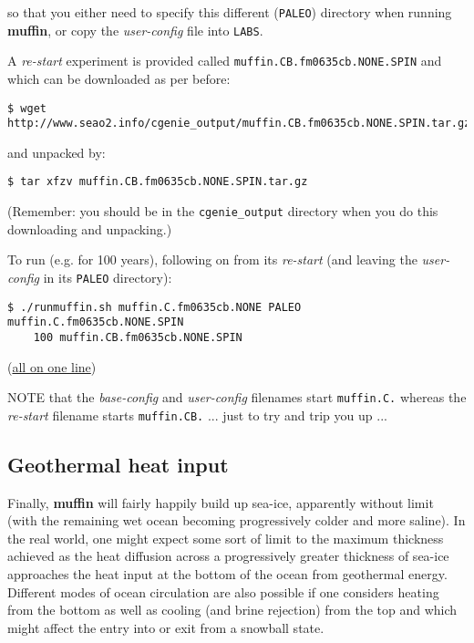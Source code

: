 \documentclass[11pt,fleqn]{book} %
\begin{document}
\noindent so that you either need to specify this different (\texttt{PALEO}) directory when running \textbf{muffin}, or copy the \textit{user-config} file into \texttt{LABS}.

A \textit{re-start }experiment is provided called \texttt{muffin.CB.fm0635cb.NONE.SPIN} and which can be downloaded as per before:

\vspace{-2mm}
\begin{verbatim}
$ wget http://www.seao2.info/cgenie_output/muffin.CB.fm0635cb.NONE.SPIN.tar.gz
\end{verbatim}
\vspace{-2mm}

\noindent and unpacked by:

\vspace{-2mm}
\begin{verbatim}
$ tar xfzv muffin.CB.fm0635cb.NONE.SPIN.tar.gz
\end{verbatim}
\vspace{-2mm}

\noindent (Remember: you should be in the \texttt{cgenie\_output} directory when you do this downloading and unpacking.)

To run (e.g. for 100 years), following on from its \textit{re-start} (and leaving the \textit{user-config} in its \texttt{PALEO} directory):

\vspace{-2mm}
\begin{verbatim}
$ ./runmuffin.sh muffin.C.fm0635cb.NONE PALEO muffin.C.fm0635cb.NONE.SPIN
    100 muffin.CB.fm0635cb.NONE.SPIN
\end{verbatim}
\vspace{-2mm}

\noindent (\uline{all on one line})

NOTE that the \textit{base-config} and \textit{user-config} filenames start \texttt{muffin.C.} whereas the\textit{ re-start} filename starts \texttt{muffin.CB.} ... just to try and trip you up ...


\subsection{Geothermal heat input}

Finally, \textbf{muffin} will fairly happily build up sea-ice, apparently without limit (with the remaining wet ocean becoming progressively colder and more saline). In the real world, one might expect some sort of limit to the maximum thickness achieved as the heat diffusion across a progressively greater thickness of sea-ice approaches the heat input at the bottom of the ocean from geothermal energy. Different modes of ocean circulation are also possible if one considers heating from the bottom as well as cooling (and brine rejection) from the top and which might affect the entry into or exit from a snowball state.
\end{document}

